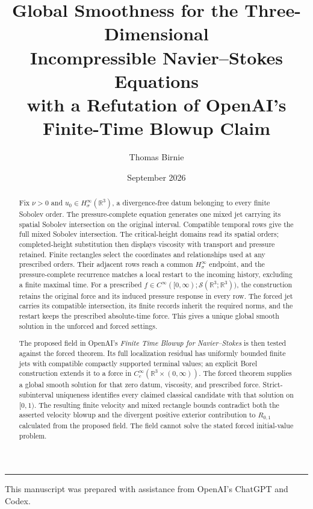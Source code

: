 \documentclass[11pt]{article}
\title{Global Smoothness for the Three-Dimensional\\
Incompressible Navier--Stokes Equations\\[0.4em]
\large with a Refutation of OpenAI's Finite-Time Blowup Claim}
\author{Thomas Birnie}
\date{September 2026}
\theoremstyle{definition}
\theoremstyle{remark}
\newcommand{\R}{\mathbb R}
\begin{document}
\maketitle

\begin{abstract}
Fix \(\nu>0\) and \(u_0\in H^\infty_\sigma(\R^3)\), a divergence-free
datum belonging to every finite Sobolev order.
The pressure-complete equation generates one mixed jet carrying its spatial
Sobolev intersection on the original interval. Compatible temporal rows give
the full mixed Sobolev intersection. The critical-height domains read its
spatial orders; completed-height substitution then displays viscosity with
transport and pressure retained. Finite rectangles select the coordinates
and relationships used at any prescribed orders. Their adjacent rows reach
a common \(H^\infty_\sigma\) endpoint, and the pressure-complete recurrence
matches a local restart to the incoming history, excluding a finite maximal
time. For a prescribed
\(f\in C^\infty([0,\infty);\mathcal S(\R^3;\R^3))\), the construction
retains the original force and its induced pressure response in every row.
The forced jet carries its compatible intersection, its finite records
inherit the required norms, and the restart keeps the prescribed
absolute-time force. This gives a unique global smooth solution in the
unforced and forced settings.

The proposed field in OpenAI's \emph{Finite Time Blowup for Navier--Stokes}
is then tested against the forced theorem. Its full localization residual has
uniformly bounded finite jets with compatible compactly supported terminal
values; an explicit Borel construction extends it to a force in
\(C_c^\infty(\R^3\times(0,\infty))\). The forced theorem supplies a global
smooth solution for that zero datum, viscosity, and prescribed force.
Strict-subinterval uniqueness identifies every claimed classical candidate
with that solution on \([0,1)\). The resulting finite velocity and mixed
rectangle bounds contradict both the asserted velocity blowup and the
divergent positive exterior contribution to \(R_{0,1}\) calculated from the
proposed field. The field
cannot solve the stated forced initial-value problem.
\end{abstract}

\vfill
\begingroup
\footnotesize
\noindent\rule{0.4\textwidth}{0.4pt}\par
\noindent This manuscript was prepared with assistance from OpenAI's ChatGPT and Codex.\par
\endgroup
\end{document}
